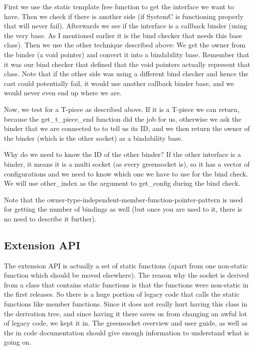 \documentclass[a4paper,10pt]{article}          %
\newcommand{\code}[1]{{\ttfamily#1}}
\begin{document}
First we use the static template free function to get the interface we want to have. Then we check if there is another side (if SystemC is functioning properly that will never fail).
Afterwards we see if the interface is a callback binder (using the very base. As I mentioned earlier it is the bind checker that needs this base class). Then we use the other technique described above:
We get the owner from the binder (a void pointer) and convert it into a bindability base. Remember that it was our bind checker that defined that the void pointers actually represent that class. Note that if the other side was using a different bind checker and hence the cast could potentially fail, it would use another callback binder base, and we would never even end up where we are.

Now, we test for a T-piece as described above. If it is a T-piece we can return, because the \code{get\_t\_piece\_end} function did the job for us, otherwise we ask the binder that we are connected to to tell us its ID, and we then return the owner of the binder (which is the other socket) as a bindability base.

Why do we need to know the ID of the other binder? If the other interface is a binder, it means it is a multi socket (as every greensocket is), so it has a vector of configurations and we need to know which one we have to use for the bind check. We will use \code{other\_index} as the argument to \code{get\_config} during the bind check.

Note that the owner-type-independent-member-function-pointer-pattern is used for getting the number of bindings as well (but once you are used to it, there is no need to describe it further).

\subsection{Extension API}

The extension API is actually a set of static functions (apart from one non-static function which should be moved elsewhere). The reason why the socket is derived from a class that contains static functions is that the functions were non-static in the first releases. So there is a huge portion of legacy code that calls the static functions like member functions. Since it does not really hurt having this class in the derivation tree, and since having it there saves us from changing an awful lot of legacy code, we kept it in. The greensocket overview and user guide, as well as the in code documentation should give enough information to understand what is going on.
\end{document}
